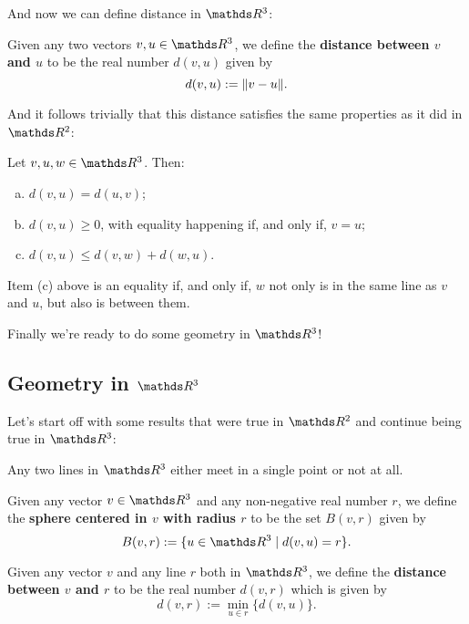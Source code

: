 And now we can define distance in $\R^3$:

\begin{df}
	Given any two vectors $v,u\in \R^3$, we define the \textbf{distance between $v$ and $u$} to be the real number $d(v,u)$ given by
	\[d(v,u):=\lVert v-u\rVert.\]
\end{df}

And it follows trivially that this distance satisfies the same properties as it did in $\R^2$:

\begin{prop}
	Let $v,u,w\in \R^3$. Then:
	\begin{enumerate}[a)]
		\item $d(v,u)=d(u,v)$;
		\item $d(v,u)\geq 0$, with equality happening if, and only if, $v=u$;
		\item $d(v,u)\leq d(v,w)+d(w,u)$.
	\end{enumerate}
\end{prop}
\begin{cor}
	Item (c) above is an equality if, and only if, $w$ not only is in the same line as $v$ and $u$, but also is between them.
\end{cor}

Finally we're ready to do some geometry in $\R^3$!

\newpage
\subsection{Geometry in $\R^3$}

Let's start off with some results that were true in $\R^2$ and continue being true in $\R^3$:

\begin{prop}
	Any two lines in $\R^3$ either meet in a single point or not at all.
\end{prop}


\begin{df}
	Given any vector $v\in \R^3$ and any non-negative real number $r$, we define the \textbf{sphere centered in $v$ with radius $r$} to be the set $B(v,r)$ given by
	\[B(v,r):=\{u\in \R^3\mid d(v,u)=r\}.\]
\end{df}

\begin{df}
	Given any vector $v$ and any line $r$ both in $\R^3$, we define the \textbf{distance between $v$ and $r$} to be the real number $d(v,r)$ which is given by
	\[d(v,r):=\min_{u\in r}\{d(v,u)\}.\]
\end{df}

